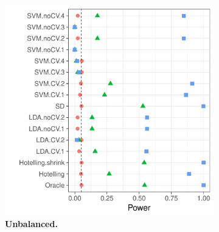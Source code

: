 \documentclass[12pt,a4paper]{article}
\begin{document}
\begin{figure}[h]
	\centering
	\caption{
		The power of a permutation test with various test statistics. 
		The power on the $x$ axis. 
		Effects are color and shape coded. 
		The various statistics on the $y$ axis. 
		Their details are given in Table~\ref{tab:collected}. 
		Effects vary over $0$ (red circle), $0.25$ (green triangle), and $0.5$ (blue square). 
		Simulation details in Appendix~\ref{apx:simulation_details}.
		Cross-validation was performed with balanced and unbalanced data folding. See sub-captions.}	
	\label{fig:simulation_1}
	\begin{subfigure}{.5\textwidth}
		\centering
		\includegraphics[width=1\linewidth]{"art/file3"}
		\caption{\textbf{Unbalanced.}} %
		\label{fig:simulation_11}
	\end{subfigure}%
	\begin{subfigure}{.5\textwidth}
		\centering

\end{subfigure}
\end{figure}
\end{document}
